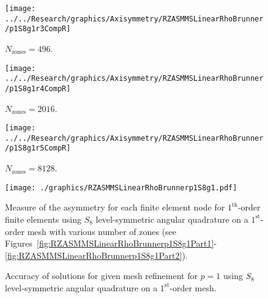 \documentclass[12pt,letterpaper]{article}
\begin{document}
\begin{sidewaysfigure}[!htb]
\centering
\begin{subfigure}{0.33\textwidth}
\texttt{[image: ../../Research/graphics/Axisymmetry/RZASMMSLinearRhoBrunner/p1S8g1r3CompR]}
\caption{$N_\text{zones}=496$.}
\end{subfigure}%
\begin{subfigure}{0.33\textwidth}
\texttt{[image: ../../Research/graphics/Axisymmetry/RZASMMSLinearRhoBrunner/p1S8g1r4CompR]}
\caption{$N_\text{zones}=2016$.}
\end{subfigure}%
\begin{subfigure}{0.33\textwidth}
\texttt{[image: ../../Research/graphics/Axisymmetry/RZASMMSLinearRhoBrunner/p1S8g1r5CompR]}
\caption{$N_\text{zones}=8128$.}
\end{subfigure}
\caption{Relative asymmetry for $p=1$ finite elements on a $1^\text{st}$-order mesh for $S_8$ level-symmetric angular quadrature for $N_\text{zones}=\{496,2016,8128\}$; mesh overlay may be removed for clarity.}
\label{fig:RZASMMSLinearRhoBrunnerp1S8g1Part2}
\end{sidewaysfigure}

\begin{figure}[!htb]
\centering
\texttt{[image: ./graphics/RZASMMSLinearRhoBrunnerp1S8g1.pdf]}
\caption{Measure of the asymmetry for each finite element node for $1^\text{th}$-order finite elements using $S_8$ level-symmetric angular quadrature on a $1^\text{st}$-order mesh with various number of zones (see Figures~\ref{fig:RZASMMSLinearRhoBrunnerp1S8g1Part1}-\ref{fig:RZASMMSLinearRhoBrunnerp1S8g1Part2}).}
\label{fig:RZASMMSLinearRhoBrunnerp1S8g1Nodes}
\end{figure}

\begin{figure}[!htb]
\centering
{}
\caption{Accuracy of solutions for given mesh refinement for $p=1$ using $S_8$ level-symmetric angular quadrature on a $1^\text{st}$-order mesh.}
\label{fig:RZASMMSLinearRhoBrunnerp1S8g1Accuracy}
\end{figure}
\end{document}
